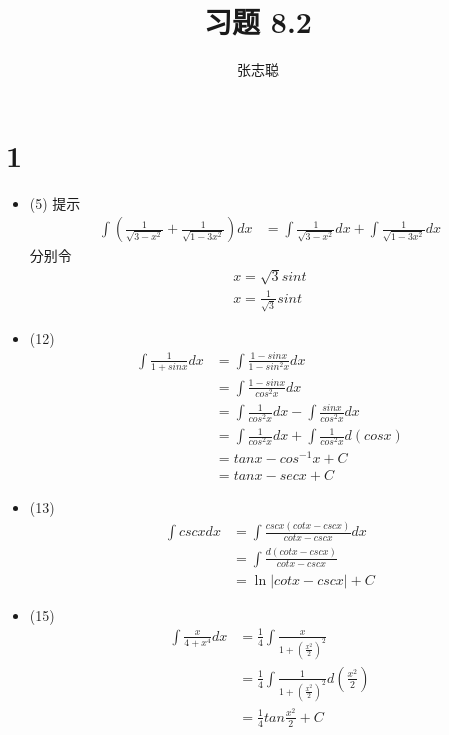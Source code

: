 \documentclass{article}
\begin{document}
\title{习题 8.2}
\author{张志聪}
\maketitle

\section*{1}

\begin{itemize}
  \item (5)
        提示
        \begin{align*}
          \int \left(\frac{1}{\sqrt{3 - x^2}} + \frac{1}{\sqrt{1-3x^2}} \right) dx
           & = \int \frac{1}{\sqrt{3 - x^2}} dx + \int \frac{1}{\sqrt{1-3x^2}} dx
        \end{align*}
        分别令
        \begin{align*}
          x = \sqrt{3} sin t \\
          x = \frac{1}{\sqrt{3}} sin t
        \end{align*}

  \item (12)
        \begin{align*}
          \int \frac{1}{1 + sin x} dx
           & = \int \frac{1 - sinx}{1 - sin^2 x} dx                      \\
           & = \int \frac{1 - sin x}{cos^2 x} dx                         \\
           & = \int \frac{1}{cos^2x} dx - \int \frac{sin x}{cos^2 x} dx  \\
           & = \int \frac{1}{cos^2x} dx + \int \frac{1}{cos^2 x} d(cosx) \\
           & = tan x - cos^{-1} x + C                                    \\
           & = tan x - sec x + C
        \end{align*}

  \item (13)
        \begin{align*}
          \int csc x dx
           & = \int \frac{cscx (cot x - csc x)}{cot x - csc x} dx \\
           & = \int \frac{d(cot x - csc x)}{cot x - csc x}        \\
           & = \ln |cot x - csc x| + C
        \end{align*}

  \item (15)
        \begin{align*}
          \int \frac{x}{4 + x^4} dx
           & = \frac{1}{4} \int \frac{x}{1 + (\frac{x^2}{2})^2}                 \\
           & = \frac{1}{4} \int \frac{1}{1 + (\frac{x^2}{2})^2}d(\frac{x^2}{2}) \\
           & = \frac{1}{4} tan \frac{x^2}{2} + C
        \end{align*}


\end{itemize}
\end{document}
